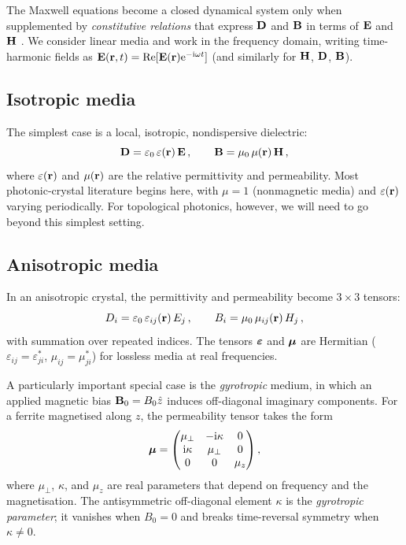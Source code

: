 The Maxwell equations become a closed dynamical system only when
supplemented by \emph{constitutive relations} that express $\mathbf{D}$
and $\mathbf{B}$ in terms of $\mathbf{E}$ and $\mathbf{H}$ \cite{khanikaev2013photonic}.  We consider linear
media and work in the frequency domain, writing time-harmonic fields as
$\mathbf{E}(\mathbf{r},t)=\mathrm{Re}[\mathbf{E}(\mathbf{r})\mathrm{e}^{-\mathrm{i}\omega t}]$ (and
similarly for $\mathbf{H}$, $\mathbf{D}$, $\mathbf{B}$).

\subsection{Isotropic media}
\label{sec:ch2-isotropic}

The simplest case is a local, isotropic, nondispersive dielectric:
\begin{equation}\label{eq:ch2-isotropic}
  \mathbf{D} = \varepsilon_0\,\varepsilon(\mathbf{r})\,\mathbf{E}\,,
  \qquad
  \mathbf{B} = \mu_0\,\mu(\mathbf{r})\,\mathbf{H}\,,
\end{equation}
where $\varepsilon(\mathbf{r})$ and $\mu(\mathbf{r})$ are the relative
permittivity and permeability.  Most photonic-crystal literature begins
here, with $\mu=1$ (nonmagnetic media) and $\varepsilon(\mathbf{r})$ varying
periodically.  For topological photonics, however, we will need to go
beyond this simplest setting.

\subsection{Anisotropic media}
\label{sec:ch2-anisotropic}

In an anisotropic crystal, the permittivity and permeability become
$3\times 3$ tensors:
\begin{equation}\label{eq:ch2-anisotropic}
  D_i = \varepsilon_0\,\varepsilon_{ij}(\mathbf{r})\,E_j\,,
  \qquad
  B_i = \mu_0\,\mu_{ij}(\mathbf{r})\,H_j\,,
\end{equation}
with summation over repeated indices.  The tensors $\boldsymbol{\varepsilon}$ and $\boldsymbol{\mu}$
are Hermitian ($\varepsilon_{ij}=\varepsilon_{ji}^*$,
$\mu_{ij}=\mu_{ji}^*$) for lossless media at real frequencies.

A particularly important special case is the \emph{gyrotropic}
medium, in which an applied magnetic bias $\mathbf{B}_0 = B_0\hat{z}$
induces off-diagonal imaginary components.  For a ferrite magnetised
along $z$, the permeability tensor takes the form
\begin{equation}\label{eq:ch2-gyrotropic-mu}
  \boldsymbol{\mu} =
  \begin{pmatrix}
    \mu_{\perp} & -\mathrm{i}\kappa & 0 \\
    \mathrm{i}\kappa & \mu_{\perp} & 0 \\
    0 & 0 & \mu_z
  \end{pmatrix},
\end{equation}
where $\mu_\perp$, $\kappa$, and $\mu_z$ are real parameters that
depend on frequency and the magnetisation.  The antisymmetric
off-diagonal element $\kappa$ is the \emph{gyrotropic parameter}; it
vanishes when $B_0=0$ and breaks time-reversal symmetry when
$\kappa\neq 0$.

